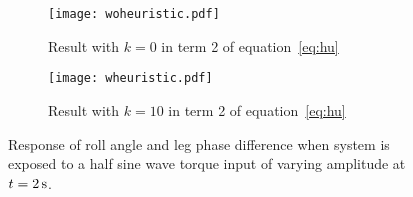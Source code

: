 \vspace{-0.25in}
\begin{figure}[tb]
\centering
\begin{subfigure}[t]{\textwidth}
    \centering
    \texttt{[image: woheuristic.pdf]}
    \caption{Result with $k=0$ in term 2 of equation~\ref{eq:hu}} 
    \label{fig:woheu}
    \vspace{0.15 in}
\end{subfigure}
\begin{subfigure}[t]{\textwidth}
    \centering
    \texttt{[image: wheuristic.pdf]}
    \caption{Result with $k=10$ in term 2 of equation~\ref{eq:hu}} 
    \label{fig:wheu}
\end{subfigure}
\caption{Response of roll angle and leg phase difference when system is exposed to a half sine wave torque input of varying amplitude at $t=\unit[2]{s}$.} 
\label{fig:results}
\end{figure}
